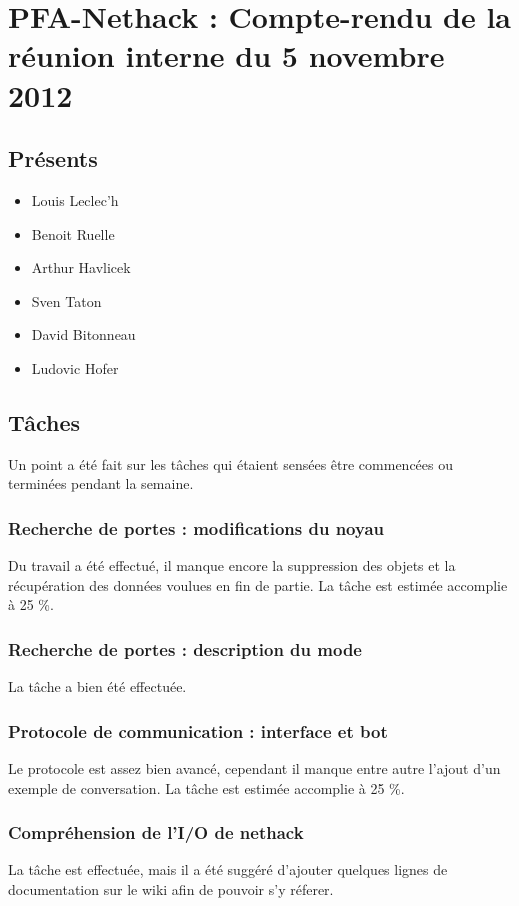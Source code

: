 \documentclass{article}
\newcommand {\ST}{Sven Taton}
\newcommand {\LL}{Louis Leclec'h}
\newcommand {\DB}{David Bitonneau}
\newcommand {\AH}{Arthur Havlicek}
\newcommand {\BR}{Benoit Ruelle}
\newcommand {\LH}{Ludovic Hofer}
\begin{document}
\section*{PFA-Nethack : Compte-rendu de la réunion interne du 5 novembre 2012}

\subsection*{Présents}
\begin{itemize}
\item \LL
\item \BR
\item \AH
\item \ST
\item \DB
\item \LH
\end{itemize}

\subsection*{Tâches}
Un point a été fait sur les tâches qui étaient sensées être commencées ou terminées pendant la semaine.

\subsubsection*{Recherche de portes : modifications du noyau}
Du travail a été effectué, il manque encore la suppression des objets et la récupération des données voulues en fin de partie. La tâche est estimée accomplie à 25 \%.

\subsubsection*{Recherche de portes : description du mode}
La tâche a bien été effectuée.

\subsubsection*{Protocole de communication : interface et bot}
Le protocole est assez bien avancé, cependant il manque entre autre l'ajout d'un exemple de conversation. La tâche est estimée accomplie à 25 \%.

\subsubsection*{Compréhension de l'I/O de nethack}
La tâche est effectuée, mais il a été suggéré d'ajouter quelques lignes de documentation sur le wiki afin de pouvoir s'y réferer.
\end{document}
